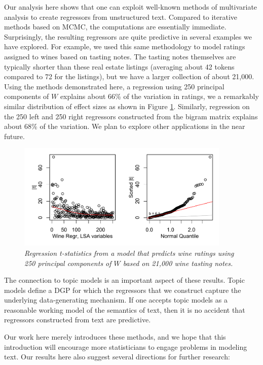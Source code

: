 \documentclass[10pt]{article}
\begin{document}
 Our analysis here shows that one can exploit well-known methods of multivariate analysis to create regressors from unstructured text.  Compared to iterative methods based on MCMC, the computations are essentially immediate.  Surprisingly, the resulting regressors are quite predictive in several examples we have explored.  For example, we used this same methodology to model ratings assigned to wines based on tasting notes.  The tasting notes themselves are typically shorter than these real estate listings (averaging about 42 tokens compared to 72 for the listings), but we have a larger collection of about 21,000.  Using the methods demonstrated here, a regression using 250 principal components of $W$ explains about 66\% of the variation in ratings, we a remarkably similar distribution of effect sizes as shown in Figure \ref{fig:wine}.  Similarly, regression on the 250 left and 250 right regressors constructed from the bigram matrix explains about 68\% of the variation.  We plan to explore other applications in the near future.
 
 
 \begin{figure}
 \caption{ \label{fig:wine} \sl Regression t-statistics from a model that predicts wine ratings using 250 principal components of $W$ based on 21,000 wine tasting notes.}
 
 \centerline{
   \includegraphics[width=4in]{figures/wine.pdf}
   }
  \end{figure} 
  
  
   The connection to topic models is an important aspect of these results.  Topic models define a DGP for which the regressors that we construct capture the underlying data-generating mechanism.  If one accepts topic models as a reasonable working model of the semantics of text, then it is no accident that regressors constructed from text are predictive.


 Our work here merely introduces these methods, and we hope that this introduction will encourage more statisticians to engage problems in  modeling text.  Our results here also suggest several directions for further research:
\end{document}

